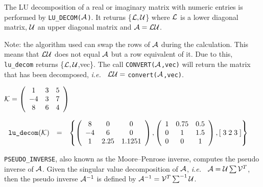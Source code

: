 The LU decomposition of a real or imaginary matrix with numeric
entries is performed by {\tt LU\_DECOM(${\cal A}$)}.
It returns \{${\cal L,U}$\} where ${\cal L}$ is a lower diagonal
matrix, ${\cal U}$ an upper diagonal matrix and ${\cal A} = {\cal LU}$.

Note: the algorithm used can swap the rows of ${\cal A}$ during
the calculation.  This means that ${\cal LU}$ does not equal ${\cal
A}$ but a row equivalent of it.  Due to this, {\tt lu\_decom} returns
\{${\cal L,U}$,vec\}.  The call {\tt CONVERT(${\cal
A}$,vec)} will return the matrix that has been
decomposed, {\em i.e.\ } ${\cal LU} = $  {\tt convert(${\cal A}$,vec)}.

\begin{flushleft}
\hspace*{0.175in}
\begin{math}  
{\cal K} = \left( \begin{array}{ccc} 1 & 3 & 5 \\ -4 & 3 & 7 \\ 8 & 6 & 
4
\end{array} \right)
\end{math}  
\end{flushleft}

\begin{flushleft}  
\begin{math}  
\begin{array}{cccc}
$%
 {\tt lu\_decom}$({\cal K}) & = & 
\left\{ 
        \left( \begin{array}{ccc} 8 & 0 & 0 \\ -4 & 6 & 0 \\ 1 & 2.25 & 
1.125 1 \end{array} \right), 
        \left( \begin{array}{ccc} 1 & 0.75 & 0.5 \\ 0 & 1 & 1.5 \\ 0 & 
0 & 1 \end{array} \right), 
        [\; 3 \; 2 \; 3 \; ]
\right\} 
\end{array}
\end{math}  
\end{flushleft}

{\tt PSEUDO\_INVERSE}, also known as the
Moore--Penrose inverse, computes
the pseudo inverse of ${\cal A}$.  
Given the singular value decomposition of ${\cal A}$, {\em i.e.\ }
${\cal A} =  {\cal U} \sum {\cal V}^T$, then the pseudo inverse ${\cal
A}^{-1}$ is defined by ${\cal A}^{-1} = {\cal V}^T \sum^{-1} {\cal U}$.

